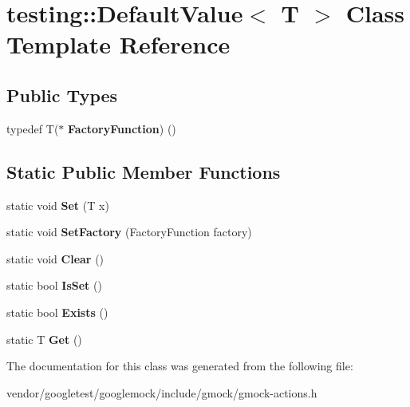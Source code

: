 \hypertarget{classtesting_1_1DefaultValue}{}\section{testing\+:\+:Default\+Value$<$ T $>$ Class Template Reference}
\label{classtesting_1_1DefaultValue}
\subsection*{Public Types}
\begin{DoxyCompactItemize}
\item 
typedef T($\ast$ {\bfseries Factory\+Function}) ()\hypertarget{classtesting_1_1DefaultValue_a5763a68d75e0a4c97fcaff708e2df803}{}\label{classtesting_1_1DefaultValue_a5763a68d75e0a4c97fcaff708e2df803}

\end{DoxyCompactItemize}
\subsection*{Static Public Member Functions}
\begin{DoxyCompactItemize}
\item 
static void {\bfseries Set} (T x)\hypertarget{classtesting_1_1DefaultValue_a5698814be364b9ac26e72ad37d6ff14e}{}\label{classtesting_1_1DefaultValue_a5698814be364b9ac26e72ad37d6ff14e}

\item 
static void {\bfseries Set\+Factory} (Factory\+Function factory)\hypertarget{classtesting_1_1DefaultValue_af012445ff5b194940c1427529707cb91}{}\label{classtesting_1_1DefaultValue_af012445ff5b194940c1427529707cb91}

\item 
static void {\bfseries Clear} ()\hypertarget{classtesting_1_1DefaultValue_a8163037b60311177cb211f070c512ee3}{}\label{classtesting_1_1DefaultValue_a8163037b60311177cb211f070c512ee3}

\item 
static bool {\bfseries Is\+Set} ()\hypertarget{classtesting_1_1DefaultValue_ad49febe2c944cbbd06451ba7d0366ca1}{}\label{classtesting_1_1DefaultValue_ad49febe2c944cbbd06451ba7d0366ca1}

\item 
static bool {\bfseries Exists} ()\hypertarget{classtesting_1_1DefaultValue_aec1ff9b510af7dbb86c837fd2409fd70}{}\label{classtesting_1_1DefaultValue_aec1ff9b510af7dbb86c837fd2409fd70}

\item 
static T {\bfseries Get} ()\hypertarget{classtesting_1_1DefaultValue_a4dc6dfee4cbc9cdb36f5c9cde5cf2b83}{}\label{classtesting_1_1DefaultValue_a4dc6dfee4cbc9cdb36f5c9cde5cf2b83}

\end{DoxyCompactItemize}


The documentation for this class was generated from the following file\+:\begin{DoxyCompactItemize}
\item 
vendor/googletest/googlemock/include/gmock/gmock-\/actions.\+h\end{DoxyCompactItemize}
